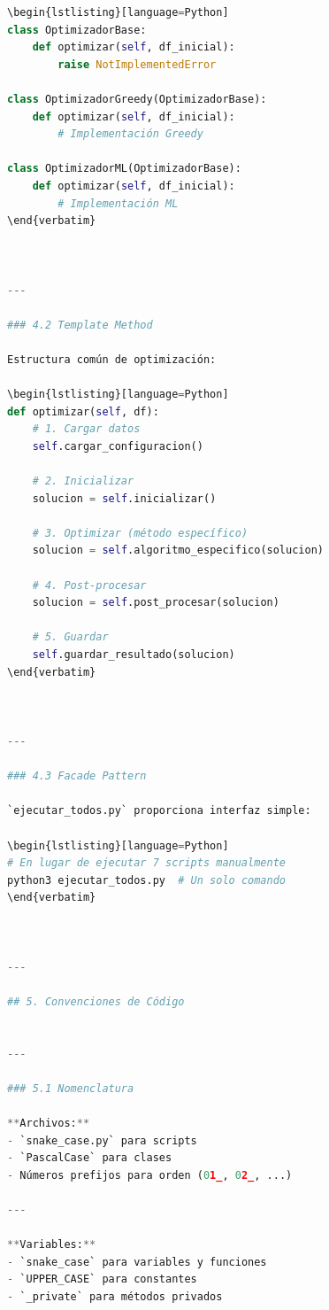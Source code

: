 \begin{itemize}
\begin{itemize}
\begin{itemize}
\begin{itemize}
\begin{itemize}
\begin{itemize}
\begin{enumerate}
\begin{enumerate}
\begin{enumerate}
\begin{enumerate}
\begin{lstlisting}[language=Python]
\begin{lstlisting}[language=Python]
class OptimizadorBase:
    def optimizar(self, df_inicial):
        raise NotImplementedError

class OptimizadorGreedy(OptimizadorBase):
    def optimizar(self, df_inicial):
        # Implementación Greedy
        
class OptimizadorML(OptimizadorBase):
    def optimizar(self, df_inicial):
        # Implementación ML
\end{verbatim}



---

### 4.2 Template Method

Estructura común de optimización:

\begin{lstlisting}[language=Python]
def optimizar(self, df):
    # 1. Cargar datos
    self.cargar_configuracion()
    
    # 2. Inicializar
    solucion = self.inicializar()
    
    # 3. Optimizar (método específico)
    solucion = self.algoritmo_especifico(solucion)
    
    # 4. Post-procesar
    solucion = self.post_procesar(solucion)
    
    # 5. Guardar
    self.guardar_resultado(solucion)
\end{verbatim}



---

### 4.3 Facade Pattern

`ejecutar_todos.py` proporciona interfaz simple:

\begin{lstlisting}[language=Python]
# En lugar de ejecutar 7 scripts manualmente
python3 ejecutar_todos.py  # Un solo comando
\end{verbatim}



---

## 5. Convenciones de Código


---

### 5.1 Nomenclatura

**Archivos:**
- `snake_case.py` para scripts
- `PascalCase` para clases
- Números prefijos para orden (01_, 02_, ...)

---

**Variables:**
- `snake_case` para variables y funciones
- `UPPER_CASE` para constantes
- `_private` para métodos privados


\end{lstlisting}
\end{enumerate}
\end{enumerate}
\end{enumerate}
\end{enumerate}
\end{itemize}
\end{itemize}
\end{itemize}
\end{itemize}
\end{itemize}
\end{itemize}
